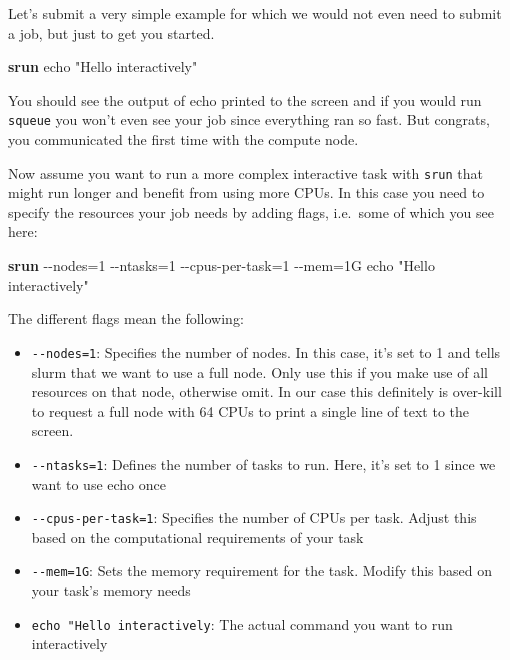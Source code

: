 \documentclass[
  letterpaper,
  DIV=11,
  numbers=noendperiod]{scrreprt}
\newenvironment{Shaded}{}{}
\newcommand{\AttributeTok}[1]{\textcolor[rgb]{0.84,0.23,0.29}{#1}}
\newcommand{\ExtensionTok}[1]{\textcolor[rgb]{0.84,0.23,0.29}{\textbf{#1}}}
\newcommand{\NormalTok}[1]{\textcolor[rgb]{0.14,0.16,0.18}{#1}}
\newcommand{\OperatorTok}[1]{\textcolor[rgb]{0.14,0.16,0.18}{#1}}
\newcommand{\StringTok}[1]{\textcolor[rgb]{0.01,0.18,0.38}{#1}}
\providecommand{\tightlist}{%
  \setlength{\itemsep}{0pt}\setlength{\parskip}{0pt}}\usepackage{longtable,booktabs,array}
\begin{document}
Let's submit a very simple example for which we would not even need to
submit a job, but just to get you started.

\begin{Shaded}
\begin{Highlighting}[]
\ExtensionTok{srun}\NormalTok{ echo }\StringTok{"Hello interactively"}
\end{Highlighting}
\end{Shaded}

You should see the output of echo printed to the screen and if you would
run \texttt{squeue} you won't even see your job since everything ran so
fast. But congrats, you communicated the first time with the compute
node.

Now assume you want to run a more complex interactive task with
\texttt{srun} that might run longer and benefit from using more CPUs. In
this case you need to specify the resources your job needs by adding
flags, i.e.~some of which you see here:

\begin{Shaded}
\begin{Highlighting}[]
\ExtensionTok{srun} \AttributeTok{{-}{-}nodes}\OperatorTok{=}\NormalTok{1 }\AttributeTok{{-}{-}ntasks}\OperatorTok{=}\NormalTok{1 }\AttributeTok{{-}{-}cpus{-}per{-}task}\OperatorTok{=}\NormalTok{1 }\AttributeTok{{-}{-}mem}\OperatorTok{=}\NormalTok{1G echo }\StringTok{"Hello interactively"}
\end{Highlighting}
\end{Shaded}

The different flags mean the following:

\begin{itemize}
\tightlist
\item
  \texttt{-\/-nodes=1}: Specifies the number of nodes. In this case,
  it's set to 1 and tells slurm that we want to use a full node. Only
  use this if you make use of all resources on that node, otherwise
  omit. In our case this definitely is over-kill to request a full node
  with 64 CPUs to print a single line of text to the screen.
\item
  \texttt{-\/-ntasks=1}: Defines the number of tasks to run. Here, it's
  set to 1 since we want to use echo once
\item
  \texttt{-\/-cpus-per-task=1}: Specifies the number of CPUs per task.
  Adjust this based on the computational requirements of your task
\item
  \texttt{-\/-mem=1G}: Sets the memory requirement for the task. Modify
  this based on your task's memory needs
\item
  \texttt{echo\ "Hello\ interactively}: The actual command you want to
  run interactively
\end{itemize}
\end{document}
